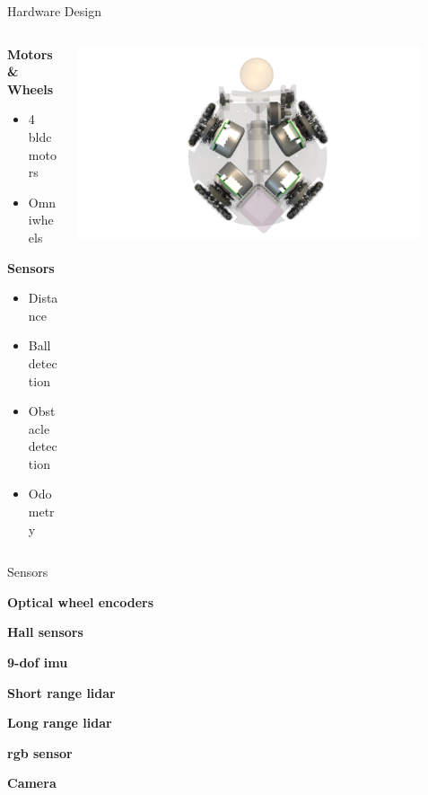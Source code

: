 
\begin{frame}{Hardware Design}
	\begin{columns}[T]
		\begin{column}{0.5\textwidth}
			\textbf{Motors \& Wheels}\\
			\begin{itemize}
				\item 4 \ac{bldc} motors
				\item Omniwheels
			\end{itemize}
			\textbf{Sensors}\\
			\begin{itemize}
				\item Distance
				\item Ball detection
				\item Obstacle detection
				\item Odometry
			\end{itemize}
		\end{column}
		\begin{column}{0.5\textwidth}
			\begin{adjustbox}{scale=2,center,margin={-1cm,3cm,2cm,0cm}}
				\includegraphics[width=0.9\textwidth]{image/png/motors_transparent.png}
			\end{adjustbox}
		\end{column}
	\end{columns}
\end{frame}


\begin{frame}{Sensors}

	\textbf{Optical wheel encoders}

	\textbf{Hall sensors}

	\textbf{9-\acf{dof} \acf{imu}}

	\textbf{Short range \acf{lidar}}

	\textbf{Long range \ac{lidar}}

	\textbf{\acf{rgb} sensor}

	\textbf{Camera}

\end{frame}

